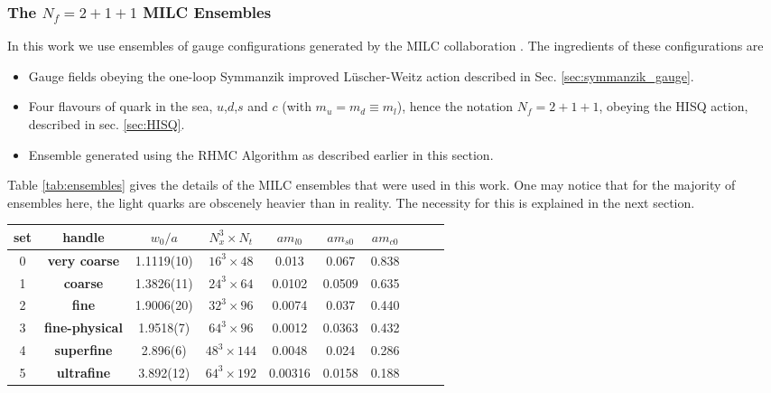 \subsubsection{The $N_f=2+1+1$ MILC Ensembles}
\label{sec:MILCensembles}

In this work we use ensembles of gauge configurations generated by the MILC collaboration \cite{Bazavov:2012xda,Bazavov:2010ru}. The ingredients of these configurations are
\begin{itemize}
\item
  Gauge fields obeying the one-loop Symmanzik improved L\"uscher-Weitz action described in Sec. \ref{sec:symmanzik_gauge}.
\item
  Four flavours of quark in the sea, $u$,$d$,$s$ and $c$ (with $m_u=m_d\equiv m_l$), hence the notation $N_f=2+1+1$, obeying the HISQ action, described in sec. \ref{sec:HISQ}.
\item
  Ensemble generated using the RHMC Algorithm as described earlier in this section.
\end{itemize}
Table \ref{tab:ensembles} gives the details of the MILC ensembles that were used in this work. One may notice that for the majority of ensembles here, the light quarks are obscenely heavier than in reality. The necessity for this is explained in the next section.

\begin{table*}[t]
  \begin{center}
    \begin{tabular}{c c c c c c c c c c}
      \hline
      set & handle & $w_0/a$  & $N_x^3\times N_t$ & $am_{l0}$ & $am_{s0}$ & $am_{c0}$  \\ [0.5ex]
      \hline
      0 & \bf{very coarse} & 1.1119(10) & $16^3\times48$ & 0.013 & 0.067 & 0.838 \\ [1ex]
      1 & \bf{coarse} & 1.3826(11) & $24^3\times64$ & 0.0102 & 0.0509 & 0.635 \\ [1ex]
      2 & \bf{fine} & 1.9006(20) & $32^3\times96$ & 0.0074 & 0.037 & 0.440 \\ [1ex]
      3 & \bf{fine-physical} & 1.9518(7) & $64^3\times96$ & 0.0012 & 0.0363 & 0.432 \\ [1ex]
      4 & \bf{superfine} & 2.896(6) & $48^3\times144$ & 0.0048 & 0.024 & 0.286 \\ [1ex]
      5 & \bf{ultrafine} & 3.892(12) &  $64^3\times192$ & 0.00316 & 0.0158 & 0.188  \\ [1ex]
      \hline
    \end{tabular}
  \end{center}
  \caption{Parameters for the MILC gluon ensembles \cite{Bazavov:2010ru,Bazavov:2012xda}. $a$ is the lattice spacing, determined from the Wilson flow parameter $w_0$. Values for $w_0/a$ are from: sets 0,1,2 \cite{Chakraborty:2016mwy}, sets 3 and 4 \cite{Chakraborty:2014aca}, set 5 \cite{mcneile:private}. The physical value of $w_0$ was determined to be $0.1715(9)$fm in \cite{Dowdall:2013rya}. Columns 5-7 give the masses used in the action for light,strange and charm quarks in the sea. \label{tab:ensembles}}
\end{table*}


